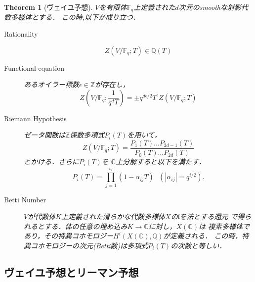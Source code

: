 \documentclass{ujarticle}
\newtheorem{thm}{Theorem}[section]
\begin{document}
\begin{thm}[ヴェイユ予想]
  $V$を有限体$\mathbb{F}_q$上定義された$d$次元のsmoothな射影代数多様体とする．
  この時,以下が成り立つ．
  \begin{description}
    \item[Rationality]
    \begin{equation*}
      Z(V/\mathbb{F}_q;T) \in \mathbb{Q}(T)
    \end{equation*}
    \item[Functional equation]
    あるオイラー標数$ \epsilon \in \mathbb{Z}$が存在し，
    \begin{equation}
      Z(V/\mathbb{F}_q;\frac{1}{q^dT})=\pm
      q^{d \epsilon/2}T^{\epsilon}Z(V/\mathbb{F}_q;T)
    \end{equation}
    \item[Riemann Hypothesis]
    ゼータ関数は$\mathbb{Z}$係数多項式$P_i(T)$を用いて，
    \begin{equation}
     Z(V/\mathbb{F}_q;T)=
     \frac{P_1(T)\dots P_{2d-1}(T)}{P_0(T)\dots P_{2d}(T)}
    \end{equation}
    とかける．さらに$P_i(T)$を
    $ \mathbb{C} $上分解すると以下を満たす．
    \begin{equation*}
     P_i(T)= \prod_{j=1}^{b_i}(1-\alpha_{ij}T) \mbox{ }
      (|\alpha_{ij}|=q^{i/2}).
    \end{equation*}
    \item[Betti Number]
    $V$が代数体$K$上定義された滑らかな代数多様体$X$の$\mathfrak{l}$を法とする還元
    で得られるとする．体の任意の埋め込み$K \to \mathbb{C}$に対し，$X(\mathbb{C})$は
    複素多様体であり，その特異コホモロジー$H^i(X(\mathbb{C}),\mathbb{Q})$が定義される．
    この時，特異コホモロジーの次元(Betti数)は多項式$P_i(T)$の次数と等しい．
  \end{description}
\end{thm}

\subsection{ヴェイユ予想とリーマン予想}
\label{sub:ヴェイユ予想とリーマン予想}
\end{document}
